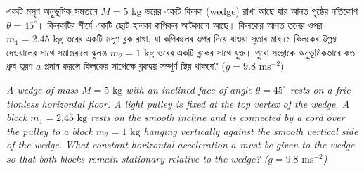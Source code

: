 \documentclass[12pt, a4paper]{article}
\begin{document}
\begin{tcolorbox}[questionbox={প্রশ্ন (Question) 34}]
\noindent
একটি মসৃণ অনুভূমিক সমতলে $M = 5\text{ kg}$ ভরের একটি কিলক (wedge) রাখা আছে যার আনত পৃষ্ঠের নতিকোণ $\theta = 45^\circ$। কিলকটির শীর্ষে একটি ছোট হালকা কপিকল আটকানো আছে। কিলকের আনত তলের ওপর $m_1 = 2.45\text{ kg}$ ভরের একটি মসৃণ ব্লক রাখা, যা কপিকলের ওপর দিয়ে যাওয়া সুতার মাধ্যমে কিলকের উল্লম্ব দেওয়ালের সাথে সমান্তরালে ঝুলন্ত $m_2 = 1\text{ kg}$ ভরের একটি ব্লকের সাথে যুক্ত। পুরো সংস্থাকে অনুভূমিকভাবে কত ধ্রুব ত্বরণ $a$ প্রদান করলে কিলকের সাপেক্ষে ব্লকদ্বয় সম্পূর্ণ স্থির থাকবে? ($g = 9.8\text{ ms}^{-2}$)

\vspace{0.8em}
\begin{english}
\noindent\textit{\color{darkgray}
A wedge of mass $M = 5\text{ kg}$ with an inclined face of angle $\theta = 45^\circ$ rests on a frictionless horizontal floor. A light pulley is fixed at the top vertex of the wedge. A block $m_1 = 2.45\text{ kg}$ rests on the smooth incline and is connected by a cord over the pulley to a block $m_2 = 1\text{ kg}$ hanging vertically against the smooth vertical side of the wedge. What constant horizontal acceleration $a$ must be given to the wedge so that both blocks remain stationary relative to the wedge? ($g = 9.8\text{ ms}^{-2}$)
}
\end{english}
\end{tcolorbox}
\end{document}
